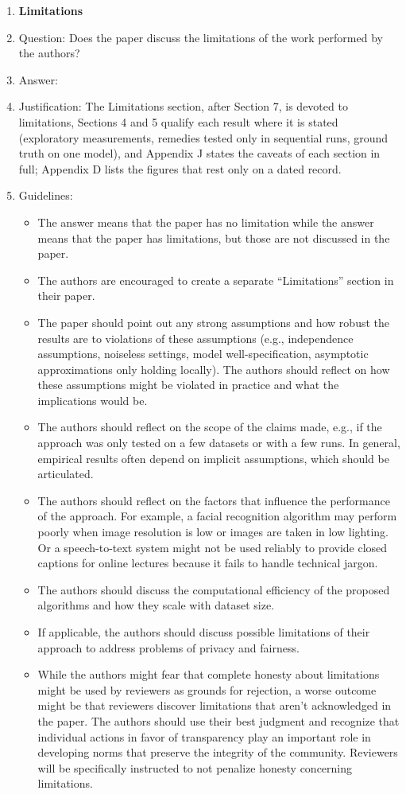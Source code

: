 \begin{enumerate}
\item {\bf Limitations}
    \item[] Question: Does the paper discuss the limitations of the work performed by the authors?
    \item[] Answer: \answerYes{}
    \item[] Justification: The Limitations section, after Section 7, is devoted to limitations, Sections 4 and 5 qualify each result where it is stated (exploratory measurements, remedies tested only in sequential runs, ground truth on one model), and Appendix J states the caveats of each section in full; Appendix D lists the figures that rest only on a dated record.
    \item[] Guidelines:
    \begin{itemize}
        \item The answer \answerNA{} means that the paper has no limitation while the answer \answerNo{} means that the paper has limitations, but those are not discussed in the paper. 
        \item The authors are encouraged to create a separate ``Limitations'' section in their paper.
        \item The paper should point out any strong assumptions and how robust the results are to violations of these assumptions (e.g., independence assumptions, noiseless settings, model well-specification, asymptotic approximations only holding locally). The authors should reflect on how these assumptions might be violated in practice and what the implications would be.
        \item The authors should reflect on the scope of the claims made, e.g., if the approach was only tested on a few datasets or with a few runs. In general, empirical results often depend on implicit assumptions, which should be articulated.
        \item The authors should reflect on the factors that influence the performance of the approach. For example, a facial recognition algorithm may perform poorly when image resolution is low or images are taken in low lighting. Or a speech-to-text system might not be used reliably to provide closed captions for online lectures because it fails to handle technical jargon.
        \item The authors should discuss the computational efficiency of the proposed algorithms and how they scale with dataset size.
        \item If applicable, the authors should discuss possible limitations of their approach to address problems of privacy and fairness.
        \item While the authors might fear that complete honesty about limitations might be used by reviewers as grounds for rejection, a worse outcome might be that reviewers discover limitations that aren't acknowledged in the paper. The authors should use their best judgment and recognize that individual actions in favor of transparency play an important role in developing norms that preserve the integrity of the community. Reviewers will be specifically instructed to not penalize honesty concerning limitations.
    \end{itemize}


\end{enumerate}
